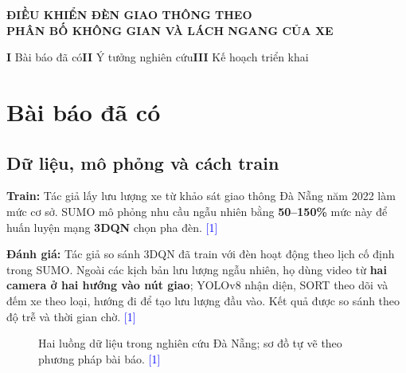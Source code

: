 \documentclass[11pt,a4paper,headings=small,parskip=half]{scrartcl}
\newcommand{\src}[1]{\textcolor{blue}{[#1]}}
\begin{document}
{\centering\sffamily\fontsize{18}{23}\selectfont\bfseries\color{navy}
ĐIỀU KHIỂN ĐÈN GIAO THÔNG THEO\\
PHÂN BỐ KHÔNG GIAN VÀ LÁCH NGANG CỦA XE\par}
\par\vspace{2mm}\noindent{\color{teal}\rule{\dimexpr\linewidth-12pt}{1.4pt}}\par\vspace{1mm}
\noindent\colorbox{pale}{\parbox{\dimexpr\linewidth-2\fboxsep-14pt}{\small\sffamily\color{navy}
\textbf{I} Bài báo đã có\hfill \textbf{II} Ý tưởng nghiên cứu\hfill \textbf{III} Kế hoạch triển khai}}
\par\vspace{2mm}

\section{Bài báo đã có}
\subsection{Dữ liệu, mô phỏng và cách train}
\textbf{Train:} Tác giả lấy lưu lượng xe từ khảo sát giao thông Đà Nẵng năm 2022 làm mức cơ sở. SUMO mô phỏng nhu cầu ngẫu nhiên bằng \textbf{50--150\%} mức này để huấn luyện mạng \textbf{3DQN} chọn pha đèn. \src{1}

\textbf{Đánh giá:} Tác giả so sánh 3DQN đã train với đèn hoạt động theo lịch cố định trong SUMO. Ngoài các kịch bản lưu lượng ngẫu nhiên, họ dùng video từ \textbf{hai camera ở hai hướng vào nút giao}; YOLOv8 nhận diện, SORT theo dõi và đếm xe theo loại, hướng đi để tạo lưu lượng đầu vào. Kết quả được so sánh theo độ trễ và thời gian chờ. \src{1}

\begin{figure}[H]\centering
{}
\caption{Hai luồng dữ liệu trong nghiên cứu Đà Nẵng; sơ đồ tự vẽ theo phương pháp bài báo. \src{1}}
\end{figure}
\end{document}
